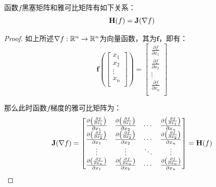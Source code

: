 \documentclass[11pt]{article}
\begin{document}
\begin{appendices}
\begin{property}
函数$f$黑塞矩阵和雅可比矩阵有如下关系：
\begin{equation*}
    \mathbf{H}(f) = \mathbf{J}(\nabla{f})
\end{equation*}
\end{property}

\begin{proof}
    如上所述$\nabla f: \mathbb{R}^n \rightarrow \mathbb{R}^n$为向量函数，其为$\mathbf{f}$，即有：
    \begin{equation*}
        \mathbf{f} \left(
        \begin{bmatrix}
            x_1 \\
            x_2 \\
            \vdots \\
            x_n \\
        \end{bmatrix}
        \right)
        = \begin{bmatrix}
            \frac{\partial f}{\partial x_1} \\
            \frac{\partial f}{\partial x_2} \\
            \vdots \\
            \frac{\partial f}{\partial x_n} \\
        \end{bmatrix}
    \end{equation*}

    那么此时函数$f$梯度的雅可比矩阵为：
    \begin{equation*}
       \mathbf{J}(\nabla f) = \begin{bmatrix}
            \frac{\partial \left(\frac{\partial f}{\partial x_1}\right)}{\partial x_1} & 
            \frac{\partial \left(\frac{\partial f}{\partial x_1}\right)}{\partial x_2} & \cdots &
            \frac{\partial \left(\frac{\partial f}{\partial x_1}\right)}{\partial x_n} \\
            \frac{\partial \left(\frac{\partial f}{\partial x_2}\right)}{\partial x_1} & 
            \frac{\partial \left(\frac{\partial f}{\partial x_2}\right)}{\partial x_2} & \cdots &
            \frac{\partial \left(\frac{\partial f}{\partial x_2}\right)}{\partial x_n} \\
            \vdots & \vdots & \ddots & \vdots \\
            \frac{\partial \left(\frac{\partial f}{\partial x_n}\right)}{\partial x_1} &
            \frac{\partial \left(\frac{\partial f}{\partial x_n}\right)}{\partial x_2} & \cdots &
            \frac{\partial \left(\frac{\partial f}{\partial x_n}\right)}{\partial x_n} \\
        \end{bmatrix} = \mathbf{H}(f)
    \end{equation*}
\end{proof}

\end{appendices}
\end{document}
